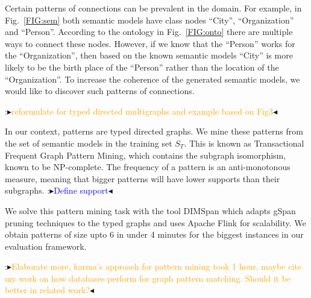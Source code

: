 \documentclass[letterpaper]{article} %
\newcommand{\authornote}[3]{
  {\fbox{\sc 
  #1}:$\blacktriangleright$\textcolor{#2}{\small{#3}}$\blacktriangleleft$}%
}
\newcommand{\ddg}[1]{\authornote{DDG}{blue}{#1}}
\newcommand{\npr}[1]{\authornote{NPR}{orange}{#1}}
\begin{document}
Certain patterns of connections can be prevalent in the domain.
For example, in Fig.~\ref{FIG:sem} both semantic models have class nodes ``City'', ``Organization'' and ``Person''.
According to the ontology in Fig.~\ref{FIG:onto} there are multiple ways to connect these nodes.
However, if we know that the ``Person'' works for the ``Organization'', then based on the known semantic models ``City'' is more likely to be the birth place of the ``Person'' rather than the location of the ``Organization''.
To increase the coherence of the generated semantic models, we would like to discover such patterns of connections.


\npr{reformulate for typed directed multigraphs and example based on Fig3}
In our context, patterns are typed directed graphs.
We mine these patterns from the set of semantic models in the training set $S_T$.
This is known as Transactional Frequent Graph Pattern Mining, which contains the subgraph 
isomorphism, known to be NP-complete.
The frequency of a pattern is an anti-monotonous measure, meaning that bigger 
patterns will have lower supports than their subgraphs. \ddg{Define support}
We solve this pattern mining task with the tool DIMSpan \cite{petermann2017dimspan} which adapts gSpan~\cite{yan2002gspan} pruning techniques to the typed graphs and uses Apache Flink for scalability.  
We obtain patterns of size upto 6 in under 4 minutes for the biggest instances in our evaluation framework. 
\npr{Elaborate more, karma's approach for pattern mining took 1 hour, maybe 
cite my work on how databases perform for graph pattern matching. Should it be 
better in related work?}


\end{document}
